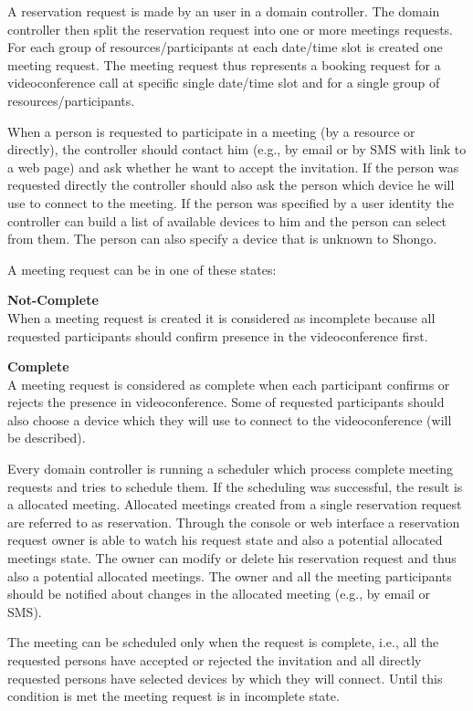 A reservation request is made by an user in a domain controller. The domain controller then
split the reservation request into one or more meetings requests. For each group of resources/participants at each date/time slot is created one meeting request. The meeting request thus represents a booking request for a videoconference call at specific single date/time slot and for a single group of resources/participants.

When a person is requested to participate in a meeting (by a resource or directly), the controller should contact him (e.g., by email or by SMS with link to a web page) and ask whether he want to accept the invitation. If the person was requested directly the controller should also ask the person which device he will use to connect to the meeting. If the person was specified by a user identity the controller can build a list of available devices to him and the person can select from them. The person can also specify a device that is unknown to Shongo. 

A meeting request can be in one of these states:
\begin{compactenum}
\item \textbf{Not-Complete} \\
  When a meeting request is created it is considered as incomplete 
  because all requested participants should confirm presence in
  the videoconference first.
\item \textbf{Complete} \\
  A meeting request is considered as complete when each participant 
  confirms or rejects the presence in videoconference. Some of
  requested participants should also choose a device which they will use 
  to connect to the videoconference (will be described).
\end{compactenum}
Every domain controller is running a scheduler which process complete meeting requests and tries to schedule them. If the scheduling was successful, the result is a allocated meeting.
Allocated meetings created from a single reservation request are referred to as reservation. Through the console or web interface a reservation request owner is able to watch his request state and also a potential allocated meetings state. The owner can modify or delete his reservation request and thus also a potential allocated meetings. The owner and all the meeting participants should be notified about changes in the allocated meeting (e.g., by email or SMS). 

The meeting can be scheduled only when the request is complete, i.e., all the requested persons have accepted or rejected the invitation and all directly requested persons have selected devices by which they will connect. Until this condition is met the meeting request is in incomplete state.

